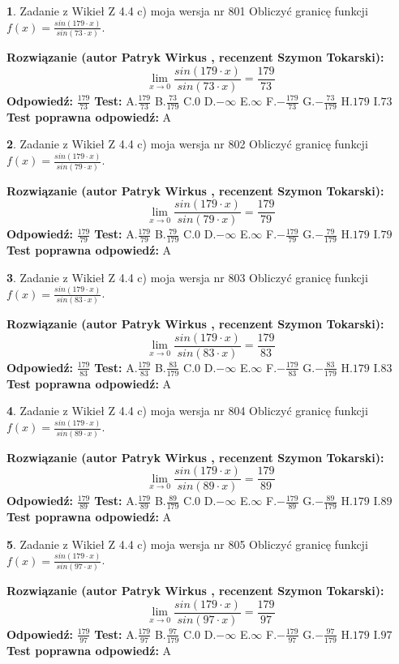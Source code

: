 \documentclass[12pt, a4paper]{article}
\theoremstyle{definition} %
\newtheorem{zad}{}
\newcommand{\zadStart}[1]{\begin{zad}#1\newline}
\newcommand{\zadStop}{\end{zad}}
\newcommand{\rozwStart}[2]{\noindent \textbf{Rozwiązanie (autor #1 , recenzent #2): }\newline}
\newcommand{\rozwStop}{\newline}
\newcommand{\odpStart}{\noindent \textbf{Odpowiedź:}\newline}
\newcommand{\odpStop}{\newline}
\newcommand{\testStart}{\noindent \textbf{Test:}\newline}
\newcommand{\testStop}{\newline}
\newcommand{\kluczStart}{\noindent \textbf{Test poprawna odpowiedź:}\newline}
\newcommand{\kluczStop}{\newline}
\begin{document}
\zadStart{Zadanie z Wikieł Z 4.4 c) moja wersja nr 801}
Obliczyć granicę funkcji $f(x)=\frac{sin(179\cdot x)}{sin(73\cdot x)}$.
\zadStop
\rozwStart{Patryk Wirkus}{Szymon Tokarski}
$$\lim\limits_{x\to 0}\frac{sin(179\cdot x)}{sin(73\cdot x)}=
\frac{179}{73}$$
\rozwStop
\odpStart
$\frac{179}{73}$
\odpStop
\testStart
A.$\frac{179}{73}$
B.$\frac{73}{179}$
C.$0$
D.$-\infty$
E.$\infty$
F.$-\frac{179}{73}$
G.$-\frac{73}{179}$
H.$179$
I.$73$
\testStop
\kluczStart
A
\kluczStop



\zadStart{Zadanie z Wikieł Z 4.4 c) moja wersja nr 802}
Obliczyć granicę funkcji $f(x)=\frac{sin(179\cdot x)}{sin(79\cdot x)}$.
\zadStop
\rozwStart{Patryk Wirkus}{Szymon Tokarski}
$$\lim\limits_{x\to 0}\frac{sin(179\cdot x)}{sin(79\cdot x)}=
\frac{179}{79}$$
\rozwStop
\odpStart
$\frac{179}{79}$
\odpStop
\testStart
A.$\frac{179}{79}$
B.$\frac{79}{179}$
C.$0$
D.$-\infty$
E.$\infty$
F.$-\frac{179}{79}$
G.$-\frac{79}{179}$
H.$179$
I.$79$
\testStop
\kluczStart
A
\kluczStop



\zadStart{Zadanie z Wikieł Z 4.4 c) moja wersja nr 803}
Obliczyć granicę funkcji $f(x)=\frac{sin(179\cdot x)}{sin(83\cdot x)}$.
\zadStop
\rozwStart{Patryk Wirkus}{Szymon Tokarski}
$$\lim\limits_{x\to 0}\frac{sin(179\cdot x)}{sin(83\cdot x)}=
\frac{179}{83}$$
\rozwStop
\odpStart
$\frac{179}{83}$
\odpStop
\testStart
A.$\frac{179}{83}$
B.$\frac{83}{179}$
C.$0$
D.$-\infty$
E.$\infty$
F.$-\frac{179}{83}$
G.$-\frac{83}{179}$
H.$179$
I.$83$
\testStop
\kluczStart
A
\kluczStop



\zadStart{Zadanie z Wikieł Z 4.4 c) moja wersja nr 804}
Obliczyć granicę funkcji $f(x)=\frac{sin(179\cdot x)}{sin(89\cdot x)}$.
\zadStop
\rozwStart{Patryk Wirkus}{Szymon Tokarski}
$$\lim\limits_{x\to 0}\frac{sin(179\cdot x)}{sin(89\cdot x)}=
\frac{179}{89}$$
\rozwStop
\odpStart
$\frac{179}{89}$
\odpStop
\testStart
A.$\frac{179}{89}$
B.$\frac{89}{179}$
C.$0$
D.$-\infty$
E.$\infty$
F.$-\frac{179}{89}$
G.$-\frac{89}{179}$
H.$179$
I.$89$
\testStop
\kluczStart
A
\kluczStop



\zadStart{Zadanie z Wikieł Z 4.4 c) moja wersja nr 805}
Obliczyć granicę funkcji $f(x)=\frac{sin(179\cdot x)}{sin(97\cdot x)}$.
\zadStop
\rozwStart{Patryk Wirkus}{Szymon Tokarski}
$$\lim\limits_{x\to 0}\frac{sin(179\cdot x)}{sin(97\cdot x)}=
\frac{179}{97}$$
\rozwStop
\odpStart
$\frac{179}{97}$
\odpStop
\testStart
A.$\frac{179}{97}$
B.$\frac{97}{179}$
C.$0$
D.$-\infty$
E.$\infty$
F.$-\frac{179}{97}$
G.$-\frac{97}{179}$
H.$179$
I.$97$
\testStop
\kluczStart
A
\kluczStop
\end{document}
